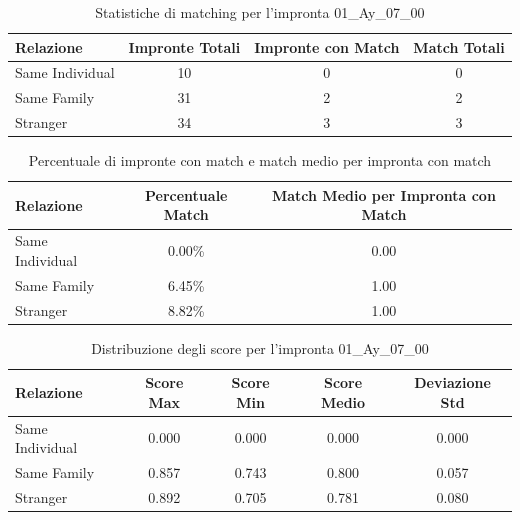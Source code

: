 \begin{table}[htbp]
\centering
\caption{Statistiche di matching per l'impronta 01\_Ay\_07\_00}
\label{tab:results_01_Ay_07_00}
\begin{tabular}{|l|c|c|c|}
\hline
\textbf{Relazione} & \textbf{Impronte Totali} & \textbf{Impronte con Match} & \textbf{Match Totali} \\
\hline
Same Individual & 10 & 0 & 0 \\
\hline
Same Family & 31 & 2 & 2 \\
\hline
Stranger & 34 & 3 & 3 \\
\hline
\end{tabular}
\end{table}


\begin{table}[htbp]
\centering
\caption{Percentuale di impronte con match e match medio per impronta con match}
\label{tab:match_percentage_01_Ay_07_00}
\begin{tabular}{|l|c|c|}
\hline
\textbf{Relazione} & \textbf{Percentuale Match} & \textbf{Match Medio per Impronta con Match} \\
\hline
Same Individual & 0.00\% & 0.00 \\
\hline
Same Family & 6.45\% & 1.00 \\
\hline
Stranger & 8.82\% & 1.00 \\
\hline
\end{tabular}
\end{table}


\begin{table}[htbp]
\centering
\caption{Distribuzione degli score per l'impronta 01\_Ay\_07\_00}
\label{tab:scores_01_Ay_07_00}
\begin{tabular}{|l|c|c|c|c|}
\hline
\textbf{Relazione} & \textbf{Score Max} & \textbf{Score Min} & \textbf{Score Medio} & \textbf{Deviazione Std} \\
\hline
Same Individual & 0.000 & 0.000 & 0.000 & 0.000 \\
\hline
Same Family & 0.857 & 0.743 & 0.800 & 0.057 \\
\hline
Stranger & 0.892 & 0.705 & 0.781 & 0.080 \\
\hline
\end{tabular}
\end{table}


